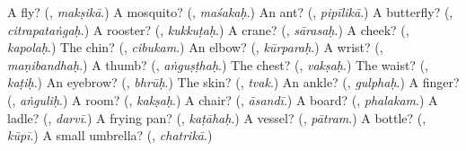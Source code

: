 \begin{tcolorbox}[breakable,colback=teal!4,colframe=teal!35!black,title={Before you move on}]
A fly? (\textbf{}, \emph{makṣikā}.) A mosquito? (\textbf{}, \emph{maśakaḥ}.) An ant? (\textbf{}, \emph{pipīlikā}.) A butterfly? (\textbf{}, \emph{citrapataṅgaḥ}.) A rooster? (\textbf{}, \emph{kukkuṭaḥ}.) A crane? (\textbf{}, \emph{sārasaḥ}.) A cheek? (\textbf{}, \emph{kapolaḥ}.) The chin? (\textbf{}, \emph{cibukam}.) An elbow? (\textbf{}, \emph{kūrparaḥ}.) A wrist? (\textbf{}, \emph{maṇibandhaḥ}.) A thumb? (\textbf{}, \emph{aṅguṣṭhaḥ}.) The chest? (\textbf{}, \emph{vakṣaḥ}.) The waist? (\textbf{}, \emph{kaṭiḥ}.) An eyebrow? (\textbf{}, \emph{bhrūḥ}.) The skin? (\textbf{}, \emph{tvak}.) An ankle? (\textbf{}, \emph{gulphaḥ}.) A finger? (\textbf{}, \emph{aṅguliḥ}.) A room? (\textbf{}, \emph{kakṣaḥ}.) A chair? (\textbf{}, \emph{āsandī}.) A board? (\textbf{}, \emph{phalakam}.) A ladle? (\textbf{}, \emph{darvī}.) A frying pan? (\textbf{}, \emph{kaṭāhaḥ}.) A vessel? (\textbf{}, \emph{pātram}.) A bottle? (\textbf{}, \emph{kūpī}.) A small umbrella? (\textbf{}, \emph{chatrikā}.)
\end{tcolorbox}
